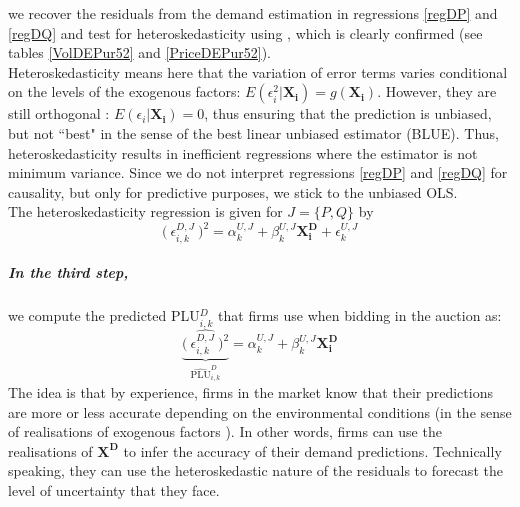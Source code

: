 
we recover the residuals from the demand estimation in regressions \ref{regDP} and \ref{regDQ} and test for heteroskedasticity using \cite{white1980heteroskedasticity}, which is clearly confirmed (see tables \ref{VolDEPur52} and \ref{PriceDEPur52}). \\

Heteroskedasticity means here that the variation of error terms varies conditional on the levels of the exogenous factors: $E(\epsilon_i^2 \vert \boldsymbol{X_i})=g(\boldsymbol{X_i})$. However, they are still orthogonal%
: $E(\epsilon_i \vert \boldsymbol{X_i})=0$, thus ensuring that the prediction is unbiased, but not ``best" in the sense of the best linear unbiased estimator (BLUE). Thus, heteroskedasticity results in inefficient regressions where the estimator is not minimum variance. 
Since we do not interpret regressions \ref{regDP} and \ref{regDQ} for causality, but only for predictive purposes, we stick to the unbiased OLS. \\

The heteroskedasticity regression is given for $J=\{P,Q\}$ by
\begin{equation}
\label{heteroskedeqn}
 \bigl( \: \epsilon_{i,k}^{D,J}\: \bigr)^2= \alpha^{U,J}_{k} + \beta^{U,J}_{k} \boldsymbol{X^D_i} 
 +\epsilon^{U,J}_{k}
\end{equation}



\subparagraph{In the third step,} we compute the predicted PLU$^D_{i,k}$ that firms use when bidding in the auction as:
\begin{equation}
\label{predictu}
 \underbrace{ \widehat{ \bigl( \: \epsilon_{i,k}^{D,J}\: \bigr)^2}}_{\widehat{\text{PLU}}^D_{i,k}}= \alpha^{U,J}_{k} + \beta^{U,J}_{k} \boldsymbol{X^D_i} 
\end{equation}
The idea is that by experience, firms in the market know that their predictions are more or less accurate depending on the environmental conditions (in the sense of realisations of exogenous factors%
). In other words, firms can use the realisations of $ \boldsymbol{X^D}$ to infer the accuracy of their demand predictions. %
 Technically speaking, they can use the heteroskedastic nature of the residuals to forecast the level of uncertainty that they face.\\


